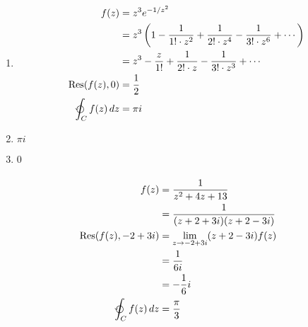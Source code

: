 \documentclass{article}
\newcommand{\Res}{\operatorname{Res}}
\begin{document}
\begin{enumerate}
  \item

        \begin{align*}
          f(z)                              & = z^3 e^{-1 / z^2}                                                                                         \\
                                            & = z^3 \left( 1 - \frac{1}{1! \cdot z^2} + \frac{1}{2! \cdot z^4} - \frac{1}{3! \cdot z^6} + \cdots \right) \\
                                            & = z^3 - \frac{z}{1!} + \frac{1}{2! \cdot z} - \frac{1}{3! \cdot z^3} + \cdots                              \\
          \Res(f(z), 0)                     & = \frac{1}{2}                                                                                              \\
          \varointctrclockwise_C f(z) \,d z & = \pi i
        \end{align*}

  \item $\pi i$

  \item $0$
\end{enumerate}

\setcounter{subsubsection}{20}
\subsubsection{}

\begin{align*}
  f(z)                              & = \frac{1}{z^2 + 4 z + 13}                         \\
                                    & = \frac{1}{(z + 2 + 3 i) (z + 2 - 3 i)}            \\
  \Res(f(z), -2 + 3 i)              & = \lim_{z \rightarrow -2 + 3 i} (z + 2 - 3 i) f(z) \\
                                    & = \frac{1}{6 i}                                    \\
                                    & = -\frac{1}{6} i                                   \\
  \varointctrclockwise_C f(z) \,d z & = \frac{\pi}{3}
\end{align*}

\setcounter{subsubsection}{22}
\subsubsection{}
\end{document}
